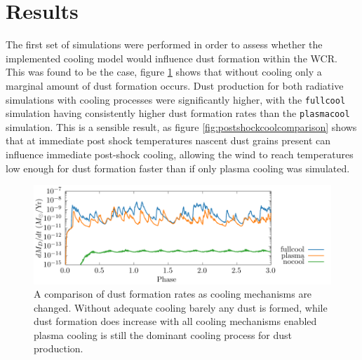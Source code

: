 \section{Results}

The first set of simulations were performed in order to assess whether the implemented cooling model would influence dust formation within the WCR.
This was found to be the case, figure \ref{fig:coolingprocess-dustproduction} shows that without cooling only a marginal amount of dust formation occurs.
Dust production for both radiative simulations with cooling processes were significantly higher, with the \texttt{fullcool} simulation having consistently higher dust formation rates than the \texttt{plasmacool} simulation.
This is a sensible result, as figure \ref{fig:postshockcoolcomparison} shows that at immediate post shock temperatures nascent dust grains present can influence immediate post-shock cooling, allowing the wind to reach temperatures low enough for dust formation faster than if only plasma cooling was simulated.

\begin{figure}
  \centering
  \includegraphics{assets/cool-results/cool-phase-dust_rate.pdf}
  \caption[Comparison of dust formation rates with cooling methods]{A comparison of dust formation rates as cooling mechanisms are changed. Without adequate cooling barely any dust is formed, while dust formation does increase with all cooling mechanisms enabled plasma cooling is still the dominant cooling process for dust production.}
  \label{fig:coolingprocess-dustproduction}
\end{figure}

